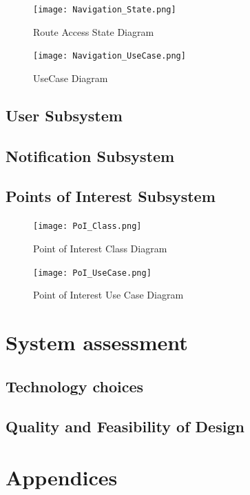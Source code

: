 \documentclass{article}
\begin{document}
				\begin{figure}[H]
                     \texttt{[image: Navigation\_State.png]}
                     \caption{Route Access State Diagram}
					 \label{fig:navigation_state}
			    \end{figure}
			    
			    \begin{figure}[H]
                     \texttt{[image: Navigation\_UseCase.png]}
                     \caption{UseCase Diagram}
					 \label{fig:navigation_UseCase}
			    \end{figure}

			    
			\subsection{User Subsystem}\label{subsec:users}
			\subsection{Notification Subsystem}\label{subsec:notification}

			\newpage
			\subsection{Points of Interest Subsystem}\label{subsec:points of interest}
				\begin{figure}[H]
		 \texttt{[image: PoI\_Class.png]}
                     \caption{Point of Interest Class Diagram}
					 \label{fig:PoI_class}
			    \end{figure}

			\begin{figure}[H]
		 \texttt{[image: PoI\_UseCase.png]}
                     \caption{Point of Interest Use Case Diagram}
					 \label{fig:PoI_UseCase}
			    \end{figure}

		\newpage

		\section{System assessment}\label{sec:assessment }	
			\subsection{Technology choices}\label{subsec:tech choices}
			\subsection{Quality and Feasibility of Design}\label{subsec:quality}

	 \cleardoublepage
	 \section{Appendices}\label{sec:appendices}
 		
	
\end{document}
